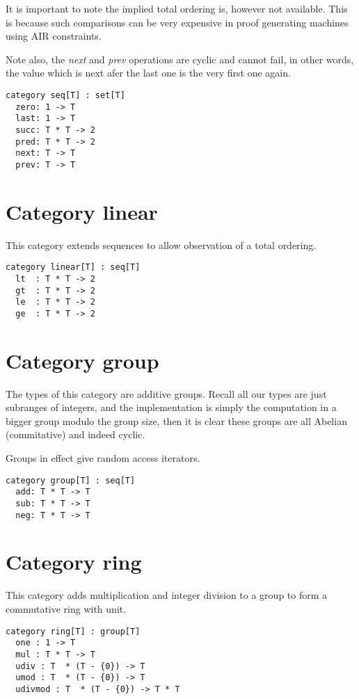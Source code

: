 \documentclass[oneside]{book}
\theoremstyle{plain}
\theoremstyle{definition}
\theoremstyle{plain}
\begin{document}
It is important to note the implied total ordering is, however
not available. This is because such comparisons can be very
expensive in proof generating machines using AIR constraints.

Note also, the {\em next} and {\em prev} operations are cyclic and
cannot fail, in other words, the value which is next afer the last
one is the very first one again.

\begin{verbatim}
category seq[T] : set[T]
  zero: 1 -> T
  last: 1 -> T
  succ: T * T -> 2
  pred: T * T -> 2
  next: T -> T
  prev: T -> T
\end{verbatim}

\section{Category linear}
This category extends sequences to allow observation of a total ordering.

\begin{verbatim}
category linear[T] : seq[T]
  lt  : T * T -> 2
  gt  : T * T -> 2
  le  : T * T -> 2
  ge  : T * T -> 2
\end{verbatim}

\section{Category group}
The types of this category are additive groups. Recall all our types are
just subranges of integers, and the implementation is simply the
computation in a bigger group modulo the group size, then it is clear
these groups are all Abelian (commitative) and indeed cyclic.

Groups in effect give random access iterators.

\begin{verbatim}
category group[T] : seq[T]
  add: T * T -> T
  sub: T * T -> T
  neg: T * T -> T
\end{verbatim}

\section{Category ring}
This category adds multiplication and integer division to a group
to form a commutative ring with unit.

\begin{verbatim}
category ring[T] : group[T]
  one : 1 -> T
  mul : T * T -> T
  udiv : T  * (T - {0}) -> T
  umod : T  * (T - {0}) -> T
  udivmod : T  * (T - {0}) -> T * T
\end{verbatim}
\end{document}
